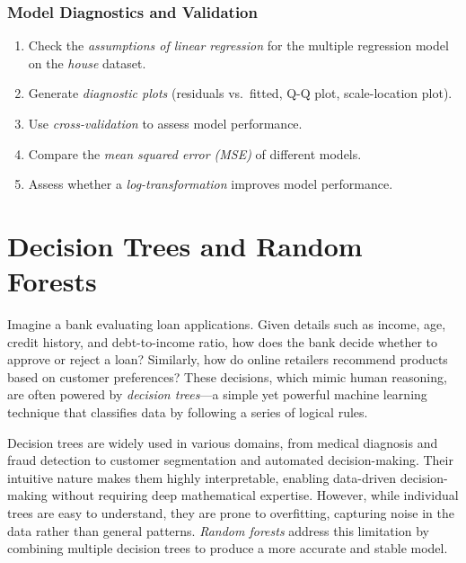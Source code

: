 \documentclass[
  11pt,
]{book}
\providecommand{\tightlist}{%
  \setlength{\itemsep}{0pt}\setlength{\parskip}{0pt}}
\theoremstyle{definition}
\theoremstyle{definition}
\theoremstyle{definition}
\theoremstyle{definition}
\theoremstyle{remark}
\begin{document}
\subsection*{Model Diagnostics and Validation}\label{model-diagnostics-and-validation}


\begin{enumerate}
\def\labelenumi{\arabic{enumi}.}
\setcounter{enumi}{49}
\tightlist
\item
  Check the \emph{assumptions of linear regression} for the multiple regression model on the \emph{house} dataset.\\
\item
  Generate \emph{diagnostic plots} (residuals vs.~fitted, Q-Q plot, scale-location plot).\\
\item
  Use \emph{cross-validation} to assess model performance.\\
\item
  Compare the \emph{mean squared error (MSE)} of different models.\\
\item
  Assess whether a \emph{log-transformation} improves model performance.
\end{enumerate}

\chapter{Decision Trees and Random Forests}\label{chapter-tree}

Imagine a bank evaluating loan applications. Given details such as income, age, credit history, and debt-to-income ratio, how does the bank decide whether to approve or reject a loan? Similarly, how do online retailers recommend products based on customer preferences? These decisions, which mimic human reasoning, are often powered by \emph{decision trees}---a simple yet powerful machine learning technique that classifies data by following a series of logical rules.

Decision trees are widely used in various domains, from medical diagnosis and fraud detection to customer segmentation and automated decision-making. Their intuitive nature makes them highly interpretable, enabling data-driven decision-making without requiring deep mathematical expertise. However, while individual trees are easy to understand, they are prone to overfitting, capturing noise in the data rather than general patterns. \emph{Random forests} address this limitation by combining multiple decision trees to produce a more accurate and stable model.
\end{document}
